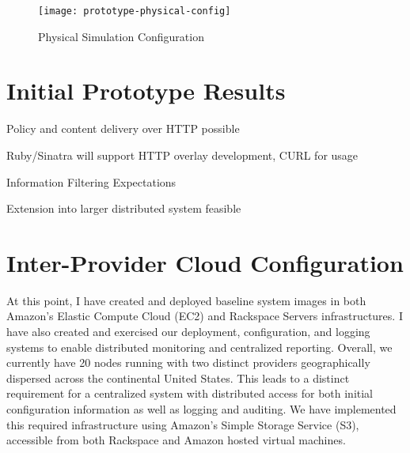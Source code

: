 \begin{figure}[!t]
\centering
\texttt{[image: prototype-physical-config]}
\caption{Physical Simulation Configuration}
\label{fig:model:prototype-physical-config}
\end{figure}

\section{Initial Prototype Results}

Policy and content delivery over HTTP possible

Ruby/Sinatra will support HTTP overlay development, CURL for usage

Information Filtering Expectations

Extension into larger distributed system feasible

\section{Inter-Provider Cloud Configuration}
At this point, I have created and deployed baseline system images in both Amazon's Elastic Compute Cloud (EC2) and Rackspace Servers infrastructures.  I have also created and exercised our deployment, configuration, and logging systems to enable distributed monitoring and centralized reporting.  Overall, we currently have 20 nodes running with two distinct providers geographically dispersed across the continental United States.  This leads to a distinct requirement for a centralized system with distributed access for both initial configuration information as well as logging and auditing.  We have implemented this required infrastructure using Amazon's Simple Storage Service (S3), accessible from both Rackspace and Amazon hosted virtual machines.

